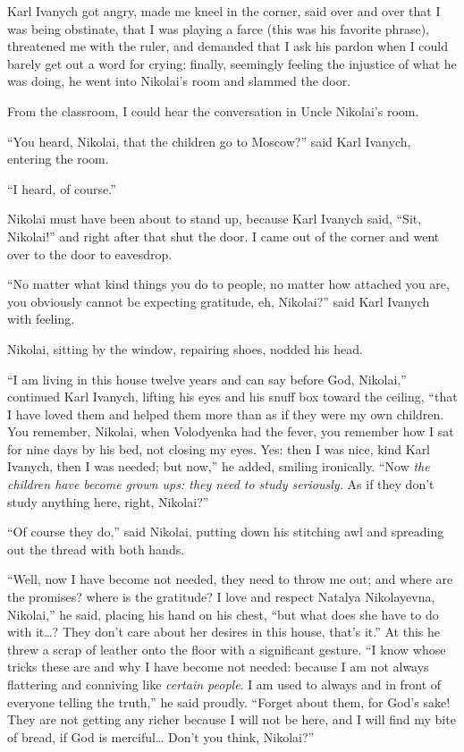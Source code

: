 Karl Ivanych got angry, made me kneel in the corner, said over and over that I was being obstinate, that I was playing a farce (this was his favorite phrase), threatened me with the ruler, and demanded that I ask his pardon when I could barely get out a word for crying; finally, seemingly feeling the injustice of what he was doing, he went into Nikolai's room and slammed the door.

From the classroom, I could hear the conversation in Uncle Nikolai's room.

``You heard, Nikolai, that the children go to Moscow?'' said Karl Ivanych, entering the room. %

``I heard, of course.'' %

Nikolai must have been about to stand up, because Karl Ivanych said, ``Sit, Nikolai!'' and right after that shut the door. I came out of the corner and went over to the door to eavesdrop.

``No matter what kind things you do to people, no matter how attached you are, you obviously cannot be expecting gratitude, eh, Nikolai?'' said Karl Ivanych with feeling. %

Nikolai, sitting by the window, repairing shoes, nodded his head.

``I am living in this house twelve years and can say before God, Nikolai,'' continued Karl Ivanych, lifting his eyes and his snuff box toward the ceiling, ``that I have loved them and helped them more than as if they were my own children. You remember, Nikolai, when Volodyenka had the fever, you remember how I sat for nine days by his bed, not closing my eyes. Yes: then I was nice, kind Karl Ivanych, then I was needed; but now,'' he added, smiling ironically. ``Now \emph{the children have become grown ups: they need to study seriously.} As if they don't study anything here, right, Nikolai?'' %

``Of course they do,'' said Nikolai, putting down his stitching awl and spreading out the thread with both hands. %

``Well, now I have become not needed, they need to throw me out; and where are the promises? where is the gratitude? I love and respect Natalya Nikolayevna, Nikolai,'' he said, placing his hand on his chest, ``but what does she have to do with it\ldots{}? They don't care about her desires in this house, that's it.'' At this he threw a scrap of leather onto the floor with a significant gesture. ``I know whose tricks these are and why I have become not needed: because I am not always flattering and conniving like \emph{certain people}. I am used to always and in front of everyone telling the truth,'' he said proudly. ``Forget about them, for God's sake! They are not getting any richer because I will not be here, and I will find my bite of bread, if God is merciful\ldots{} Don't you think, Nikolai?'' %

